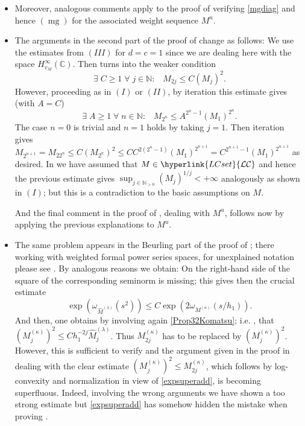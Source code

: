\documentclass[10pt]{amsart}%
\numberwithin{equation}{section}
\theoremstyle{plain}
\newcommand{\CC}{\mathbb{C}}
\newcommand{\NN}{\mathbb{N}}
\let\on=\operatorname
\begin{document}
\begin{itemize}
\item[$(IV)$] Moreover, analogous comments apply to the proof of \cite[Prop. 4.12]{weightedentirecharacterization} verifying \eqref{mgdiag} and hence \hyperlink{mg}{$(\on{mg})$} for the associated weight sequence $M^u$.

\item[$(V)$] The arguments in the second part of the proof of \cite[Cor. 4.14]{weightedentirecharacterization} change as follows: We use the estimates from $(III)$ for $d=c=1$ since we are dealing here with the space $H^{\infty}_{v_M}(\CC)$. Then \cite[$(4.9)$]{weightedentirecharacterization} turns into the weaker condition
    $$\exists\;C\ge 1\;\forall\;j\in\NN:\;\;\;M_{2j}\le C(M_j)^2.$$
    However, proceeding as in $(I)$ or $(II)$, by iteration this estimate gives (with $A=C$)
    $$\exists\;A\ge 1\;\forall\;n\in\NN:\;\;\;M_{2^n}\le A^{2^n-1}(M_1)^{2^n}.$$
    The case $n=0$ is trivial and $n=1$ holds by taking $j=1$. Then iteration gives $M_{2^{n+1}}=M_{22^n}\le C(M_{2^n})^2\le CC^{2(2^n-1)}(M_1)^{2^{n+1}}=C^{2^{n+1}-1}(M_1)^{2^{n+1}}$ as desired. In \cite[Cor. 4.14]{weightedentirecharacterization} we have assumed that $M\in\hyperlink{LCset}{\mathcal{LC}}$ and hence the previous estimate gives $\sup_{j\in\NN_{>0}}(M_j)^{1/j}<+\infty$ analogously as shown in $(I)$; but this is a contradiction to the basic assumptions on $M$.

And the final comment in the proof of \cite[Cor. 4.14]{weightedentirecharacterization}, dealing with $M^u$, follows now by applying the previous explanations to $M^u$.

\item[$(VI)$] The same problem appears in the Beurling part of the proof of \cite[Prop. 4.7]{Borelmapalgebraity}; there working with weighted formal power series spaces, for unexplained notation please see \cite{Borelmapalgebraity}. By analogous reasons we obtain: On the right-hand side of \cite[$(4.8)$]{Borelmapalgebraity} the square of the corresponding seminorm is missing; this gives then the crucial estimate
    $$\exp(\omega_{\widehat{M}^{(\lambda)}}(s^2))\le C\exp(2\omega_{M^{(\kappa)}}(s/h_1)).$$
And then, one obtains by involving again \eqref{Prop32Komatsu}; i.e. \cite[$(4.7)$]{Borelmapalgebraity}, that $(M_j^{(\kappa)})^2\le Ch_1^{-2j}\widehat{M}^{(\lambda)}_j$. Thus $M^{(\kappa)}_{2j}$ has to be replaced by $(M_j^{(\kappa)})^2$. However, this is sufficient to verify \cite[$(4.6)$]{Borelmapalgebraity} and the argument given in the proof in \cite[Prop. 4.7]{Borelmapalgebraity} dealing with the clear estimate $(M_j^{(\kappa)})^2\le M^{(\kappa)}_{2j}$, which follows by log-convexity and normalization in view of \eqref{expsuperadd}, is becoming superfluous. Indeed, involving the wrong arguments we have shown a too strong estimate but \eqref{expsuperadd} has somehow hidden the mistake when proving \cite[$(4.6)$]{Borelmapalgebraity}.


\end{itemize}
\end{document}
